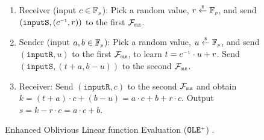\begin{figure}[ht]
\setlength{\fboxsep}{1pt}
\begin{center}
\begin{boxedminipage}{8.5cm}
\begin{small}
\begin{enumerate}[leftmargin=5.5mm]
%
\item  Receiver (input $c \in \mathbb{F}_{\scriptscriptstyle p} $): Pick a random value, $r\stackrel{\scriptscriptstyle\$}\leftarrow  \mathbb{F}_{\scriptscriptstyle p} $, and send  $(\mathtt{inputS}, (c^{\scriptscriptstyle -1}, r))$ to the first $\mathcal{F}_{\scriptscriptstyle\mathtt{OLE}}$.
%
%
\item Sender (input $a, b \in \mathbb{F}_{\scriptscriptstyle p} $): Pick a random value, $u \stackrel{\scriptscriptstyle\$}\leftarrow  \mathbb{F}_{\scriptscriptstyle p} $, and send $(\mathtt{inputR}, u)$ to the first $\mathcal{F}_{\scriptscriptstyle\mathtt{OLE}}$, to learn $t =  c^{\scriptscriptstyle -1}\cdot u
 + r$. Send $(\mathtt{inputS},(t + a, b - u))$ to the second $\mathcal{F}_{\scriptscriptstyle\mathtt{OLE}}$.
%
\item Receiver: Send $(\mathtt{inputR}, c)$ to the second $\mathcal{F}_{\scriptscriptstyle\mathtt{OLE}}$ and obtain $k = (t+a)\cdot c+(b-u)=a\cdot c + b + r\cdot c$. Output $s=k - r\cdot c=a\cdot c + b$.

\end{enumerate}
\end{small}
\end{boxedminipage}
\end{center}
 \vspace{-4mm}
\caption{
\small {Enhanced Oblivious Linear function Evaluation  ($\mathtt{OLE}^{\scriptscriptstyle +}$)  \cite{GhoshN19}}.} 
\label{fig:OLE-plus-protocol}
 \vspace{-4mm}
\end{figure}
